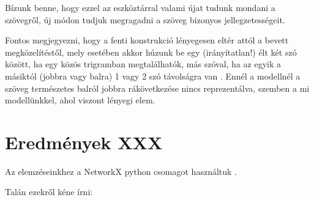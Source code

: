 \documentclass{llncs}
\newcommand{\nyil}{$\rightarrow$\ }
\newcommand{\embf}[1]{\textbf{#1}}
\newcommand{\XXX}[1]{{\small \color{megjcolor} [XXX #1]}}
\newcommand{\XXXb}[1]{\XXX{\embf{#1}}}
\begin{document}
Bízunk benne, hogy ezzel az eszköztárral
valami újat tudunk mondani a szövegről,
új módon tudjuk megragadni a szöveg bizonyos jellegzetességeit.

Fontos megjegyezni, hogy a fenti konstrukció lényegesen eltér
attól a bevett megközelítéstől,
mely esetében akkor húzunk be egy (irányítatlan!) élt
két szó között, ha egy közös trigramban megtalálhatók,
más szóval, ha az egyik a másiktól (jobbra vagy balra)
1 vagy 2 szó távolságra van
\cite{cancho2001thesmall}.
Ennél a modellnél a szöveg természetes balról jobbra rákövetkezése
nincs reprezentálva,
szemben a mi modellünkkel, ahol viszont lényegi elem.


\newpage %

\section{Eredmények XXX}

Az elemzéseinkhez a NetworkX python csomagot használtuk
\cite{hagberg2008exploring}.

Talán ezekről kéne írni:
\end{document}
